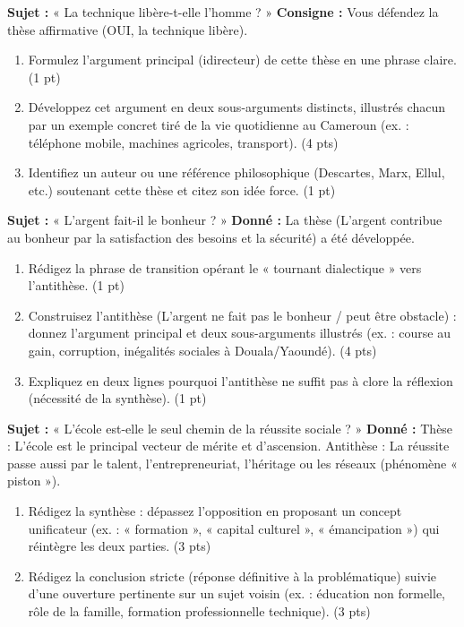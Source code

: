 \documentclass[11pt]{article}
\begin{document}
\begin{exercice}
\textbf{Sujet :} « La technique libère-t-elle l'homme ? »
\textbf{Consigne :} Vous défendez la thèse affirmative (OUI, la technique libère).
\begin{enumerate}
    \item Formulez l'argument principal (idirecteur) de cette thèse en une phrase claire. (1 pt)
    \item Développez cet argument en deux sous-arguments distincts, illustrés chacun par un exemple concret tiré de la vie quotidienne au Cameroun (ex. : téléphone mobile, machines agricoles, transport). (4 pts)
    \item Identifiez un auteur ou une référence philosophique (Descartes, Marx, Ellul, etc.) soutenant cette thèse et citez son idée force. (1 pt)
\end{enumerate}
\end{exercice}

\begin{exercice}
\textbf{Sujet :} « L'argent fait-il le bonheur ? »
\textbf{Donné :} La thèse (L'argent contribue au bonheur par la satisfaction des besoins et la sécurité) a été développée.
\begin{enumerate}
    \item Rédigez la phrase de transition opérant le « tournant dialectique » vers l'antithèse. (1 pt)
    \item Construisez l'antithèse (L'argent ne fait pas le bonheur / peut être obstacle) : donnez l'argument principal et deux sous-arguments illustrés (ex. : course au gain, corruption, inégalités sociales à Douala/Yaoundé). (4 pts)
    \item Expliquez en deux lignes pourquoi l'antithèse ne suffit pas à clore la réflexion (nécessité de la synthèse). (1 pt)
\end{enumerate}
\end{exercice}

\begin{exercice}
\textbf{Sujet :} « L'école est-elle le seul chemin de la réussite sociale ? »
\textbf{Donné :} Thèse : L'école est le principal vecteur de mérite et d'ascension. Antithèse : La réussite passe aussi par le talent, l'entrepreneuriat, l'héritage ou les réseaux (phénomène « piston »).
\begin{enumerate}
    \item Rédigez la synthèse : dépassez l'opposition en proposant un concept unificateur (ex. : « formation », « capital culturel », « émancipation ») qui réintègre les deux parties. (3 pts)
    \item Rédigez la conclusion stricte (réponse définitive à la problématique) suivie d'une ouverture pertinente sur un sujet voisin (ex. : éducation non formelle, rôle de la famille, formation professionnelle technique). (3 pts)
\end{enumerate}
\end{exercice}
\end{document}
